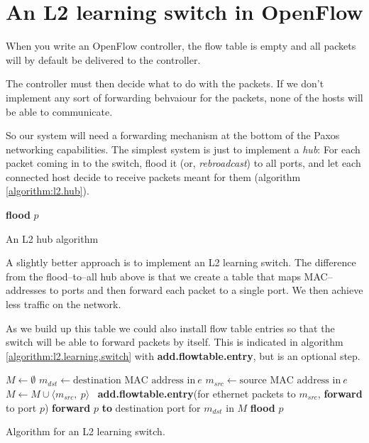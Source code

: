 \section{An L2 learning switch in OpenFlow}

When you write an OpenFlow controller, the flow table is empty and all
packets will by default be delivered to the controller.

The controller must then decide what to do with the packets.  If we don't
implement any sort of forwarding behvaiour for the packets, none of the
hosts will be able to communicate.

So our system will need a forwarding mechanism at the bottom of the Paxos
networking capabilities.  The simplest system is just to implement a
\textit{hub}:  For each packet coming in to the switch, flood it (or,
\textit{rebroadcast}) to all ports, and let each connected host decide 
to receive packets meant for them (algorithm \ref{algorithm:l2.hub}).

\begin{algorithm}
  \begin{algorithmic}
      \State \textbf{flood} $p$ 
    \EndOn
  \end{algorithmic}
  \caption{An L2 hub algorithm}
  \label{algorithm:l2.hub}
\end{algorithm}

A slightly better approach is to implement an \ac{L2} learning switch.
The difference from the flood--to--all hub above is that we create a table
that maps MAC--addresses to ports and then forward each packet to a single
port.  We then achieve less traffic on the network.

As we build up this table we could also install flow table entries so that the
switch will be able to forward packets by itself.  This is indicated in
algorithm \vref{algorithm:l2.learning.switch} with
\textbf{add.flowtable.entry}, but is an optional step.

\begin{algorithm}
  \begin{algorithmic}
    \State $M \gets \emptyset$
    \State
      \State $m_{dst} \gets \text{destination MAC address in}\ e$
      \State $m_{src} \gets \text{source MAC address in}\ e$
      \State
      \State $M \gets M \cup \langle m_{src},\ p \rangle$ 
      \State
      \State \textbf{add.flowtable.entry}(for ethernet packets to
        $m_{src}$, \textbf{forward} to port $p$)
      \State
       
        \State \textbf{forward} $p$ \textbf{to} destination port for $m_{dst}$ in $M$
      \Else
        \State \textbf{flood} $p$ 
      \EndIf
    \EndOn
  \end{algorithmic}
  \caption{Algorithm for an L2 learning switch.}
  \label{algorithm:l2.learning.switch}
\end{algorithm}

